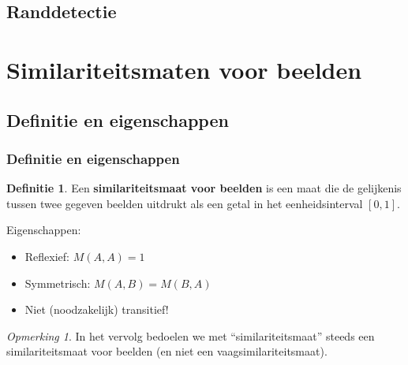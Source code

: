 \documentclass[dutch]{beamer}
\theoremstyle{definition}
\newtheorem{definitie}[theorem]{Definitie}
\theoremstyle{remark}
\newtheorem{opmerking}[theorem]{Opmerking}
\theoremstyle{example}
\begin{document}
\subsection{Randdetectie}

\section{Similariteitsmaten voor beelden}
\subsection{Definitie en eigenschappen}
\frame
{
  \frametitle{Definitie en eigenschappen}

  \begin{definitie}
  Een \textbf{similariteitsmaat voor beelden} is een maat die de gelijkenis 
  tussen twee gegeven beelden uitdrukt als een getal in het eenheidsinterval 
  $[0,1]$.
  \end{definitie}

  Eigenschappen:
  \begin{itemize}
  \item Reflexief: $M(A,A)=1$
  \item Symmetrisch: $M(A,B)=M(B,A)$
  \item Niet (noodzakelijk) transitief!
  \end{itemize}
  
  \begin{opmerking}
  In het vervolg bedoelen we met ``similariteitsmaat'' steeds een similariteitsmaat
  voor beelden (en niet een vaagsimilariteitsmaat).
  \end{opmerking}
}
\end{document}
